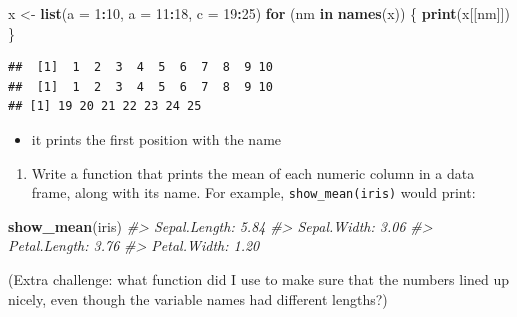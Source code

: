 \documentclass[]{book}
\newenvironment{Shaded}{\begin{snugshade}}{\end{snugshade}}
\newcommand{\CommentTok}[1]{\textcolor[rgb]{0.56,0.35,0.01}{\textit{#1}}}
\newcommand{\ControlFlowTok}[1]{\textcolor[rgb]{0.13,0.29,0.53}{\textbf{#1}}}
\newcommand{\DataTypeTok}[1]{\textcolor[rgb]{0.13,0.29,0.53}{#1}}
\newcommand{\DecValTok}[1]{\textcolor[rgb]{0.00,0.00,0.81}{#1}}
\newcommand{\KeywordTok}[1]{\textcolor[rgb]{0.13,0.29,0.53}{\textbf{#1}}}
\newcommand{\NormalTok}[1]{#1}
\newcommand{\OperatorTok}[1]{\textcolor[rgb]{0.81,0.36,0.00}{\textbf{#1}}}
\newcommand{\StringTok}[1]{\textcolor[rgb]{0.31,0.60,0.02}{#1}}
\providecommand{\tightlist}{%
  \setlength{\itemsep}{0pt}\setlength{\parskip}{0pt}}
\theoremstyle{definition}
\theoremstyle{definition}
\theoremstyle{definition}
\theoremstyle{remark}
\begin{document}
\begin{Shaded}
\begin{Highlighting}[]
\NormalTok{x <-}\StringTok{ }\KeywordTok{list}\NormalTok{(}\DataTypeTok{a =} \DecValTok{1}\OperatorTok{:}\DecValTok{10}\NormalTok{, }\DataTypeTok{a =} \DecValTok{11}\OperatorTok{:}\DecValTok{18}\NormalTok{, }\DataTypeTok{c =} \DecValTok{19}\OperatorTok{:}\DecValTok{25}\NormalTok{)}
\ControlFlowTok{for}\NormalTok{ (nm }\ControlFlowTok{in} \KeywordTok{names}\NormalTok{(x)) \{}
  \KeywordTok{print}\NormalTok{(x[[nm]])}
\NormalTok{\}}
\end{Highlighting}
\end{Shaded}

\begin{verbatim}
##  [1]  1  2  3  4  5  6  7  8  9 10
##  [1]  1  2  3  4  5  6  7  8  9 10
## [1] 19 20 21 22 23 24 25
\end{verbatim}

\begin{itemize}
\tightlist
\item
  it prints the first position with the name
\end{itemize}

\begin{enumerate}
\def\labelenumi{\arabic{enumi}.}
\setcounter{enumi}{2}
\tightlist
\item
  Write a function that prints the mean of each numeric column in a data
  frame, along with its name. For example, \texttt{show\_mean(iris)}
  would print:
\end{enumerate}

\begin{Shaded}
\begin{Highlighting}[]
\KeywordTok{show_mean}\NormalTok{(iris)}
\CommentTok{#> Sepal.Length: 5.84}
\CommentTok{#> Sepal.Width:  3.06}
\CommentTok{#> Petal.Length: 3.76}
\CommentTok{#> Petal.Width:  1.20}
\end{Highlighting}
\end{Shaded}

(Extra challenge: what function did I use to make sure that the numbers
lined up nicely, even though the variable names had different lengths?)
\end{document}
